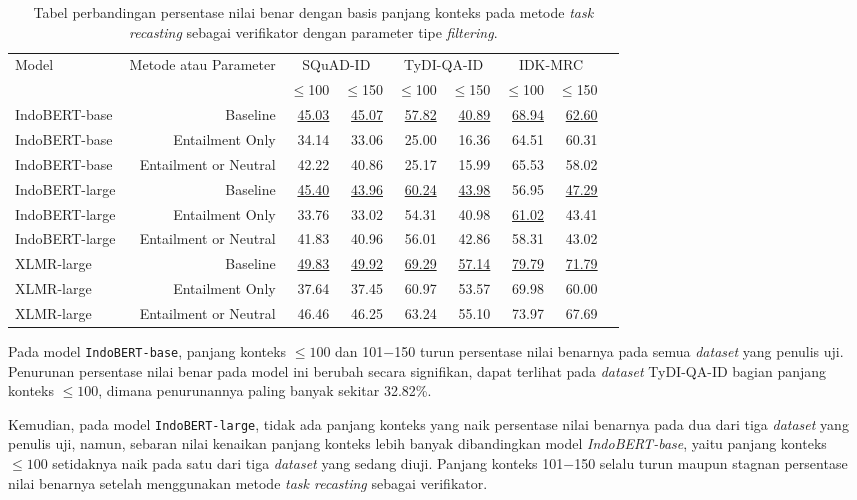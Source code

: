 \begin{table}[H]\centering
\footnotesize
\begin{tabular}{lrrrrrrrr}\toprule
\multirow{2}{*}{Model} &\multirow{2}{*}{Metode atau Parameter} &\multicolumn{2}{c}{SQuAD-ID} &\multicolumn{2}{c}{TyDI-QA-ID} &\multicolumn{2}{c}{IDK-MRC} \\\cmidrule{3-8}
& &$\leq$100 &$\leq$150 &$\leq$100 &$\leq$150 &$\leq$100 &$\leq$150 \\\midrule
IndoBERT-base &Baseline &\underline{45.03} &\underline{45.07} &\underline{57.82} &\underline{40.89} &\underline{68.94} &\underline{62.60} \\
IndoBERT-base &Entailment Only &34.14 &33.06 &25.00 &16.36 &64.51 &60.31 \\
IndoBERT-base &Entailment or Neutral &42.22 &40.86 &25.17 &15.99 &65.53 &58.02 \\
\hline
IndoBERT-large &Baseline &\underline{45.40} &\underline{43.96} &\underline{60.24} &\underline{43.98} &56.95 &\underline{47.29} \\
IndoBERT-large &Entailment Only &33.76 &33.02 &54.31 &40.98 &\underline{61.02} &43.41 \\
IndoBERT-large &Entailment or Neutral &41.83 &40.96 &56.01 &42.86 &58.31 &43.02 \\
\hline
XLMR-large &Baseline &\underline{49.83} &\underline{49.92} &\underline{69.29} &\underline{57.14} &\underline{79.79} &\underline{71.79} \\
XLMR-large &Entailment Only &37.64 &37.45 &60.97 &53.57 &69.98 &60.00 \\
XLMR-large &Entailment or Neutral &46.46 &46.25 &63.24 &55.10 &73.97 &67.69 \\
\bottomrule
\end{tabular}
\caption{Tabel perbandingan persentase nilai benar dengan basis panjang konteks pada metode \emph{task recasting} sebagai verifikator dengan parameter tipe \emph{filtering}.}
\end{table}

Pada model \texttt{IndoBERT-base}, panjang konteks $\leq100$ dan 101$-$150 turun persentase nilai benarnya pada semua \emph{dataset} yang penulis uji. Penurunan persentase nilai benar pada model ini berubah secara signifikan, dapat terlihat pada \emph{dataset} TyDI-QA-ID bagian panjang konteks $\leq100$, dimana penurunannya paling banyak sekitar 32.82\%.

Kemudian, pada model \texttt{IndoBERT-large}, tidak ada panjang konteks yang naik persentase nilai benarnya pada dua dari tiga \emph{dataset} yang penulis uji, namun, sebaran nilai kenaikan panjang konteks lebih banyak dibandingkan model \emph{IndoBERT-base}, yaitu panjang konteks  $\leq100$ setidaknya naik pada satu dari tiga \emph{dataset} yang sedang diuji. Panjang konteks  101$-$150 selalu turun maupun stagnan persentase nilai benarnya setelah menggunakan metode \emph{task recasting} sebagai verifikator.

